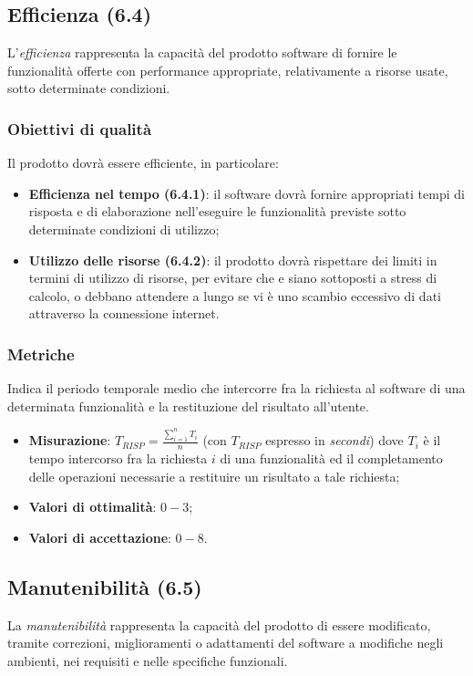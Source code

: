 \subsection{Efficienza (6.4)}
\label{efficienza}
L'\emph{efficienza} rappresenta la capacità del prodotto software di fornire le funzionalità offerte con performance appropriate, relativamente a risorse usate, sotto determinate condizioni.
\subsubsection{Obiettivi di qualità}
Il prodotto dovrà essere efficiente, in particolare:
\begin{itemize}
\item \textbf{Efficienza nel tempo (6.4.1)}: il software dovrà fornire appropriati tempi di risposta e  di elaborazione nell'eseguire le funzionalità previste sotto determinate condizioni di utilizzo;
\item \textbf{Utilizzo delle risorse (6.4.2)}: il prodotto dovrà rispettare dei limiti in termini di utilizzo di risorse, per evitare che  e  siano sottoposti a stress di calcolo, o debbano attendere a lungo se vi è uno scambio eccessivo di dati attraverso la connessione internet.
\end{itemize}
\subsubsection{Metriche}
\label{tempoRisposta}
Indica il periodo temporale medio che intercorre fra la richiesta al software di una determinata funzionalità e la restituzione del risultato all'utente.
\begin{itemize}
\item \textbf{Misurazione}: $T_{RISP} = \frac{\sum_{i=1}^{n} T_{i}}{n}$ (con $T_{RISP}$ espresso in \textit{secondi}) dove $T_{i}$ è il tempo intercorso fra la richiesta $i$ di una funzionalità ed il completamento delle operazioni necessarie a restituire un risultato a tale richiesta;
\item \textbf{Valori di ottimalità}: $0 - 3$;
\item \textbf{Valori di accettazione}: $0 - 8$.
\end{itemize}
\subsection{Manutenibilità (6.5)}
\label{manutenibilita}
La \emph{manutenibilità} rappresenta la capacità del prodotto di essere modificato, tramite correzioni, miglioramenti o adattamenti del software a modifiche negli ambienti, nei requisiti e nelle specifiche funzionali.
